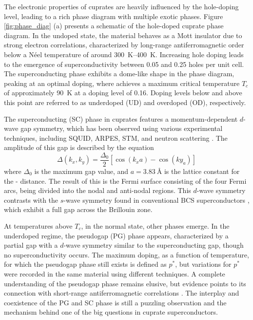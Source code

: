 The electronic properties of cuprates are heavily influenced by the hole-doping level, leading to a rich phase diagram with multiple exotic phases. Figure \ref{fig:phase_diag} (a) presents a schematic of the hole-doped cuprate phase diagram.
In the undoped state, the material behaves as a Mott insulator due to strong electron correlations, characterized by long-range antiferromagnetic order below a Néel temperature of around \qtyrange{300}{400}{\kelvin}.
Increasing hole doping leads to the emergence of superconductivity between 0.05 and 0.25 holes per unit cell.
The superconducting phase exhibits a dome-like shape in the phase diagram, peaking at an optimal doping, where  achieves a maximum critical temperature $T_c$ of approximately \qty{90}{\kelvin} at a doping level of 0.16.
Doping levels below and above this point are referred to as underdoped (UD) and overdoped (OD), respectively.

The superconducting (SC) phase in cuprates features a momentum-dependent $d$-wave gap symmetry, which has been observed using various experimental techniques, including SQUID, ARPES, STM, and neutron scattering \cite{wollman_experimental_1993, tsuei_pairing_1994, tsuei_pairing_1996, shen_anomalously_1993, ding_angle-resolved_1996, chen_unconventional_2022, renner_vacuum_1995, pan_microscopic_2001, gu_directly_2019, devereaux_electronic_1994, sacuto_nodes_1997, fong_neutron_1999}.
The amplitude of this gap is described by the equation
\begin{equation}
	\Delta(k_x,k_y) = \frac{\Delta_0}{2}\left[\cos(k_xa)-\cos(ky_a)\right]
\end{equation}
where $\Delta_0$ is the maximum gap value, and $a = \qty{3.83}{\angstrom}$ is the lattice constant for the - distance.
The result of this is the Fermi surface consisting of the four Fermi arcs, being divided into the nodal and anti-nodal regions.
This $d$-wave symmetry contrasts with the $s$-wave symmetry found in conventional BCS superconductors \cite{bardeen_theory_1957}, which exhibit a full gap across the Brillouin zone.

At temperatures above $T_c$, in the normal state, other phases emerge.
In the underdoped regime, the pseudogap (PG) phase appears, characterized by a partial gap with a $d$-wave symmetry similar to the superconducting gap, though no superconductivity occurs.
The maximum doping, as a function of temperature, for which the pseudogap phase still exists is defined as $p^*$, but variations for $p^*$ were recorded in the same material using different techniques.
A complete understanding of the pseudogap phase remains elusive, but evidence points to its connection with short-range antiferromagnetic correlations \cite{zhang_effective_1988, rice_theory_1973}.
The interplay and coexistence of the PG and SC phase is still a puzzling observation and the mechanism behind one of the big questions in cuprate superconductors.

